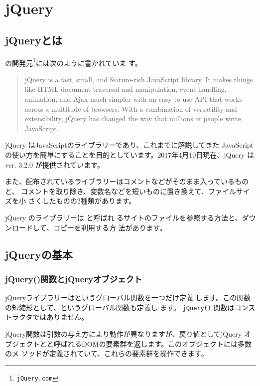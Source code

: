 \section{jQuery}
\subsection{jQueryとは}
 の開発元\footnote{\texttt{jQuery.com}}には次のように書かれていま
す。
\begin{quotation}
jQuery is a fast, small, and feature-rich JavaScript library. It makes
 things like HTML document traversal and manipulation, event handling,
 animation, and Ajax much simpler with an easy-to-use API that works
 across a multitude of browsers. With a combination of versatility and
 extensibility, jQuery has changed the way that millions of people write
 JavaScript.
\end{quotation}
jQuery はJavaScriptのライブラリーであり、これまでに解説してきた
JavaScriptの使い方を簡単にすることを目的としています。2017年4月10日現在、jQuery
は ver. 3.2.0 が提供されています。

また、配布されているライブラリーはコメントなどがそのまま入っているものと、
コメントを取り除き、変数名などを短いものに置き換えて、ファイルサイズを小
さくしたものの2種類があります。

jQuery のライブラリーは と呼ばれ
るサイトのファイルを参照する方法と、ダウンロードして、コピーを利用する方
法があります。 
\newcommand{\FuncRef}[1]{%
\refstepcounter{Func}\label{#1}({\bfseries 機能\arabic{Func}})}
\subsection{jQueryの基本}
\subsubsection{jQuery()関数とjQueryオブジェクト}
jQueryライブラリーはというグローバル関数を一つだけ定義
します。この関数の短縮形として、\ElmJ{\$}というグローバル関数も定義し
ます。
\texttt{jQuery()} 関数はコンストラクタではありません。

jQuery関数は引数の与え方により動作が異なりますが、戻り値としてjQuery
オブジェクトとと呼ばれるDOMの要素群を返します。このオブジェクトには多数のメ
ソッドが定義されていて、これらの要素群を操作できます。

